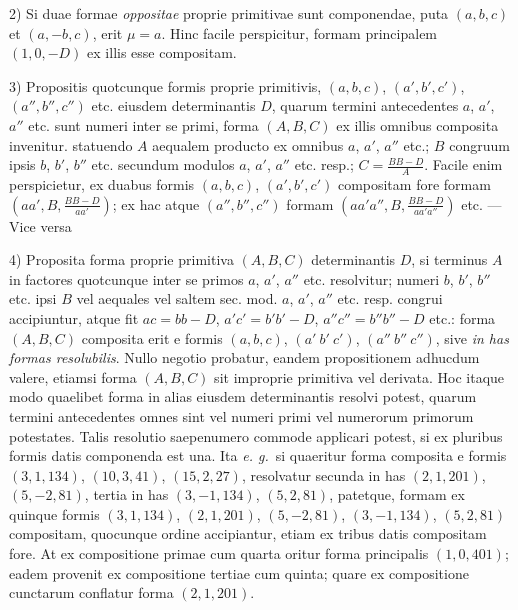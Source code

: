 2) Si duae formae \textit{oppositae} proprie primitivae sunt componendae, puta $(a,b,c)$ et $(a,-b,c)$, erit $\mu=a$. Hinc facile perspicitur, formam principalem $(1,0,-D)$ ex illis esse compositam.

3) Propositis quotcunque formis proprie primitivis, $(a,b,c)$, $(a',b',c')$, $(a'',b'',c'')$ etc. eiusdem determinantis $D$, quarum termini antecedentes $a$, $a'$, $a''$ etc. sunt numeri inter se primi, forma $(A,B,C)$ ex illis omnibus composita invenitur. statuendo $A$ aequalem producto ex omnibus $a$, $a'$, $a''$ etc.; $B$ congruum ipsis $b$, $b'$, $b''$ etc. secundum modulos $a$, $a'$, $a''$ etc. resp.; $C=\frac{BB-D}{A}$. Facile enim perspicietur, ex duabus formis $(a,b,c)$, $(a',b',c')$ compositam fore formam $(aa',B,\frac{BB-D}{aa'})$; ex hac atque $(a'',b'',c'')$ formam $(aa'a'',B,\frac{BB-D}{aa'a''})$ etc. --- Vice versa

4) Proposita forma proprie primitiva $(A,B,C)$ determinantis $D$, si terminus $A$ in factores quotcunque inter se primos $a$, $a'$, $a''$ etc. resolvitur; numeri $b$, $b'$, $b''$ etc. ipsi $B$ vel aequales vel saltem sec. mod. $a$, $a'$, $a''$ etc. resp. congrui accipiuntur, atque fit $ac=bb-D$, $a'c'=b'b'-D$, $a''c''=b''b''-D$ etc.: forma $(A,B,C)$ composita erit e formis $(a,b,c)$, $(a'\ b'\ c')$, $(a''\ b''\ c'')$, sive \textit{in has formas resolubilis}. Nullo negotio probatur, eandem propositionem adhucdum valere, etiamsi forma $(A,B,C)$ sit improprie primitiva vel derivata. Hoc itaque modo quaelibet forma in alias eiusdem determinantis resolvi potest, quarum termini antecedentes omnes sint vel numeri primi vel numerorum primorum potestates. Talis resolutio saepenumero commode applicari potest, si ex pluribus formis datis componenda est una. Ita \textit{e. g.}\ si quaeritur forma composita e formis $(3,1,134)$, $(10,3,41)$, $(15,2,27)$, resolvatur secunda in has $(2,1,201)$, $(5,-2,81)$, tertia in has $(3,-1,134)$, $(5,2,81)$, patetque, formam ex quinque formis $(3,1,134)$, $(2,1,201)$, $(5,-2,81)$, $(3,-1,134)$, $(5,2,81)$ compositam, quocunque ordine accipiantur, etiam ex tribus datis compositam fore. At ex compositione primae cum quarta oritur forma principalis $(1,0,401)$; eadem provenit ex compositione tertiae cum quinta; quare ex compositione cunctarum conflatur forma $(2,1,201)$.

